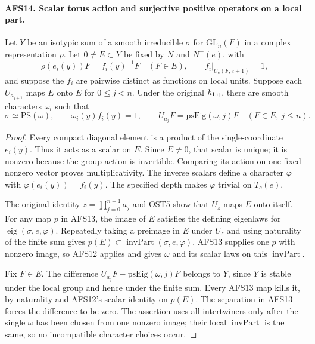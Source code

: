 \documentclass[11pt,a4paper]{article}
\numberwithin{equation}{section}
\theoremstyle{remark}\newtheorem{remark}[theorem]{Remark}
\begin{document}
\paragraph{AFS14. Scalar torus action and surjective positive operators on a local part.}
\label{claim:AFS14}
Let $Y$ be an isotypic sum of a smooth irreducible
$\sigma$ for $\mathrm{GL}_n(F)$ in a complex representation
$\rho$.  Let $0\ne E\subset Y$ be fixed by $N$ and
$N^-(e)$, with
\[
 \rho(e_i(y))F=f_i(y)^{-1}F\quad(F\in E),
 \qquad f_i|_{U_c(F,e+1)}=1,
\]
and suppose the $f_i$ are pairwise distinct as functions
on local units.  Suppose each $U_{a_{j+1}}$ maps $E$ onto
$E$ for $0\leq j<n$.  Under the original $h_{\rm Lit}$,
there are smooth characters $\omega_i$ such that
\[
 \sigma\simeq\mathrm{PS}(\omega),\qquad
 \omega_i(y)f_i(y)=1,
 \qquad U_{a_j}F=\mathrm{psEig}(\omega,j)F
                         \quad(F\in E,\ j\leq n).
\]
\begin{proof}
Every compact diagonal element is a product of the
single-coordinate $e_i(y)$.  Thus it acts as a scalar on
$E$.  Since $E\ne0$, that scalar is unique; it is nonzero
because the group action is invertible.  Comparing its
action on one fixed nonzero vector proves multiplicativity.
The inverse scalars define a character $\varphi$ with
$\varphi(e_i(y))=f_i(y)$.  The specified depth makes
$\varphi$ trivial on $T_c(e)$.

The original identity $z=\prod_{j=0}^{n-1}a_j$ and OST5
show that $U_z$ maps $E$ onto itself.  For any map $p$ in
AFS13, the image of $E$ satisfies the defining eigenlaws
for $\operatorname{eig}(\sigma,e,\varphi)$.  Repeatedly
taking a preimage in $E$ under $U_z$ and using naturality
of the finite sum gives
$p(E)\subset\operatorname{invPart}(\sigma,e,\varphi)$.
AFS13 supplies one $p$ with nonzero image, so AFS12 applies
and gives $\omega$ and its scalar laws on this
$\operatorname{invPart}$.

Fix $F\in E$.  The difference
$U_{a_j}F-\mathrm{psEig}(\omega,j)F$ belongs to $Y$,
since $Y$ is stable under the local group and hence under
the finite sum.  Every AFS13 map kills it, by naturality
and AFS12's scalar identity on $p(E)$.  The separation
in AFS13 forces the difference to be zero.  The assertion
uses all intertwiners only after the single $\omega$ has
been chosen from one nonzero image; their local
$\operatorname{invPart}$ is the same, so no incompatible
character choices occur.
\end{proof}

\end{document}
